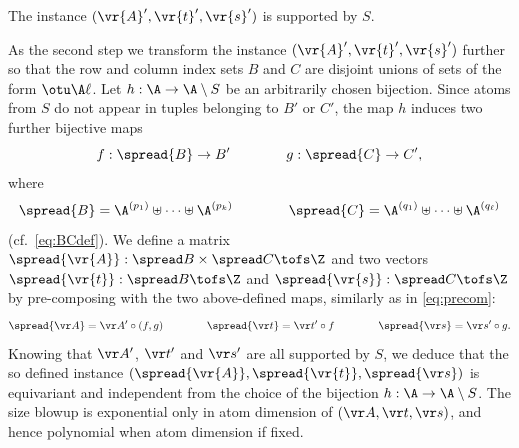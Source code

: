 The instance $(\vr{A}',\vr{t}',\vr{s}')$ is supported by $S$.



As the second step we transform the instance $(\vr{A}',\vr{t}',\vr{s}')$ further so that
the row and column index sets $B$ and $C$ are disjoint unions of sets of the form $\otu \A \ell$.
Let $h : \A \to \A \setminus S$ be an arbitrarily chosen bijection.
Since atoms from $S$ do not appear in tuples belonging to $B'$ or $C'$, the map $h$
induces two further bijective maps 
\[
f: \spread{B} \to B' \qquad\qquad g : \spread{C} \to C',
\]
where
\[
\spread{B} = \A^{(p_1)} \uplus \dots \uplus \A^{(p_k)}
\qquad\qquad
\spread{C} = \A^{(q_1)} \uplus \dots \uplus \A^{(q_{\ell})}
\]
(cf.~\eqref{eq:BCdef}).
%
%
We define a matrix $\spread{\vr{A}} : \spread B \times \spread C \tofs \Z$ 
and two vectors $\spread{\vr{t}} : \spread B \tofs \Z$ and 
$\spread{\vr{s}} : \spread C \tofs \Z$ by pre-composing with the two above-defined maps,
similarly as in \eqref{eq:precom}:
\[
\spread {\vr A} = \vr A' \circ (f,g) \qquad\qquad
\spread {\vr t} = \vr t' \circ f \qquad\qquad
\spread {\vr s} = \vr s' \circ g.
\]
Knowing that $\vr A'$, $\vr t'$ and $\vr s'$ are all supported by $S$, we deduce that
the so defined instance $(\spread{\vr{A}},\spread{\vr{t}}, \spread{\vr s})$ is equivariant and independent from
the choice of the bijection $h : \A \to \A\setminus S$.
The size blowup is exponential only in atom dimension of $(\vr A, \vr t, \vr s)$, and hence polynomial
when atom dimension if fixed.


